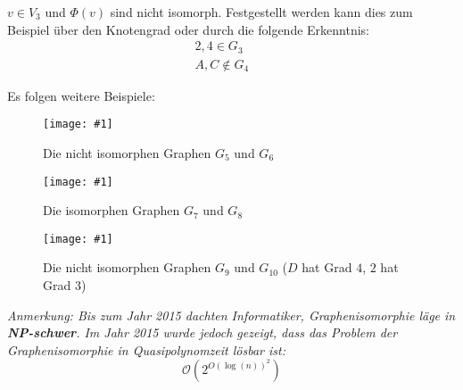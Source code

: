 \documentclass{scrartcl}%
\newcommand{\includepic}[2]{\texttt{[image: \#1]}}
\begin{document}
    $v \in V_3$ und $\Phi(v)$ sind nicht isomorph.
    Festgestellt werden kann dies zum Beispiel über den Knotengrad oder durch die folgende Erkenntnis:
    \begin{equation*}
        \begin{flalign}
            2,4 \in G_3&&\\\nonumber
            A,C \notin G_4&&
        \end{flalign}
    \end{equation*}

    \newpage
    Es folgen weitere Beispiele:
    \begin{figure}[htb]
        \centering
        \includepic{lec_04_e}{0.8}
        \caption{Die nicht isomorphen Graphen $G_5$ und $G_6$}
    \end{figure}
    \begin{figure}[htb]
        \centering
        \includepic{lec_04_f}{0.8}
        \caption{Die isomorphen Graphen $G_7$ und $G_8$}
    \end{figure}
    \begin{figure}[htb]
        \centering
        \includepic{lec_04_g}{0.8}
        \caption{Die nicht isomorphen Graphen $G_9$ und $G_{10}$ ($D$ hat Grad $4$, $2$ hat Grad $3$)}
    \end{figure}

    \textit{Anmerkung: Bis zum Jahr 2015 dachten Informatiker, Graphenisomorphie läge in \textbf{\textsf{NP-schwer}}.
    Im Jahr 2015 wurde jedoch gezeigt, dass das Problem der Graphenisomorphie in Quasipolynomzeit lösbar ist:}
    \begin{equation*}
        \mathcal{O}(2^{O(\log(n))^2})
    \end{equation*}
\end{document}
